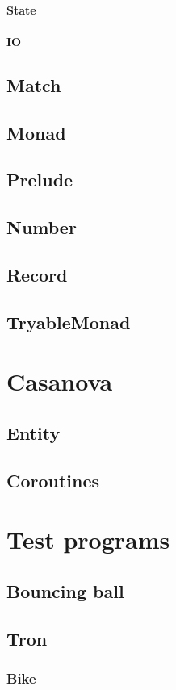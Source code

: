 \subsubsection{State}
\subsubsection{IO}
\section{Match}
\section{Monad}
\section{Prelude}
\section{Number}
\section{Record}
\section{TryableMonad}

\chapter{Casanova}
\section{Entity}
\section{Coroutines}

\chapter{Test programs}
\section{Bouncing ball}
\section{Tron}
\subsection{Bike}
